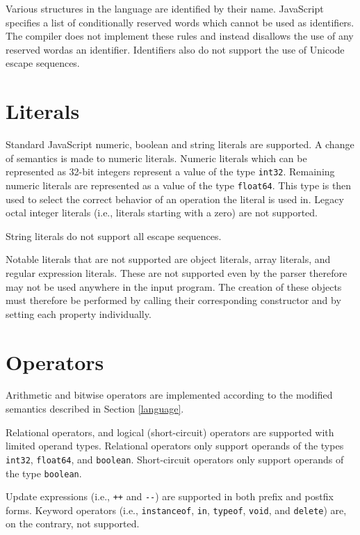 Various structures in the language are identified by their name. JavaScript specifies a list of conditionally reserved words which cannot be used as identifiers. The compiler does not implement these rules and instead disallows the use of any reserved word\footnotemark[1] as an identifier. Identifiers also do not support the use of Unicode escape sequences.



\section{Literals}

Standard JavaScript numeric, boolean and string literals are supported. A change of semantics is made to numeric literals. Numeric literals which can be represented as 32-bit integers represent a value of the type \texttt{int32}. Remaining numeric literals are represented as a value of the type \texttt{float64}. This type is then used to select the correct behavior of an operation the literal is used in. Legacy octal integer literals (i.e., literals starting with a zero) are not supported.

String literals do not support all escape sequences.

Notable literals that are not supported are object literals, array literals, and regular expression literals. These are not supported even by the parser therefore may not be used anywhere in the input program. The creation of these objects must therefore be performed by calling their corresponding constructor and by setting each property individually.


\section{Operators}

Arithmetic and bitwise operators are implemented according to the modified semantics described in Section \ref{language}.

Relational operators, and logical (short-circuit) operators are supported with limited operand types. Relational operators only support operands of the types \texttt{int32}, \texttt{float64}, and \texttt{boolean}. Short-circuit operators only support operands of the type \texttt{boolean}.

Update expressions (i.e., \texttt{++} and \texttt{{-}{-}}) are supported in both prefix and postfix forms. Keyword operators (i.e., \texttt{instanceof}, \texttt{in}, \texttt{typeof}, \texttt{void}, and \texttt{delete}) are, on the contrary, not supported.

